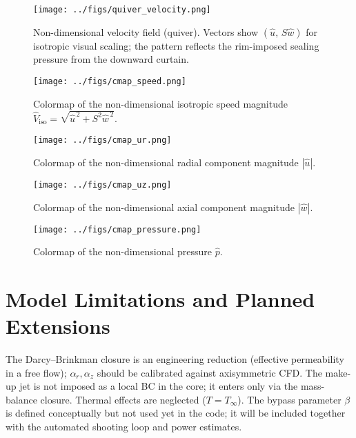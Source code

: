 \documentclass[11pt,a4paper]{article}
\begin{document}
\begin{figure}[H]
  \centering
  \texttt{[image: ../figs/quiver\_velocity.png]}
  \caption{Non-dimensional velocity field (quiver).
Vectors show $(\hat u,\,S\hat w)$ for isotropic visual scaling; the pattern reflects the rim-imposed sealing pressure from the downward curtain.}
  \label{fig:quiver}
\end{figure}\begin{figure}[H]
  \centering
  \texttt{[image: ../figs/cmap\_speed.png]}
  \caption{Colormap of the non-dimensional isotropic speed magnitude $\hat V_{\mathrm{iso}}=\sqrt{\hat u^{\,2}+S^{2}\hat w^{\,2}}$.}
  \label{fig:cmap_speed}
\end{figure}\begin{figure}[H]
  \centering
  \texttt{[image: ../figs/cmap\_ur.png]}
  \caption{Colormap of the non-dimensional radial component magnitude $|\hat u|$.}
  \label{fig:cmap_ur}
\end{figure}\begin{figure}[H]
  \centering
  \texttt{[image: ../figs/cmap\_uz.png]}
  \caption{Colormap of the non-dimensional axial component magnitude $|\hat w|$.}
  \label{fig:cmap_uz}
\end{figure}\begin{figure}[H]
  \centering
  \texttt{[image: ../figs/cmap\_pressure.png]}
  \caption{Colormap of the non-dimensional pressure $\hat p$.}
  \label{fig:cmap_p}
\end{figure}

\section{Model Limitations and Planned Extensions}
\label{sec:model-limitations-and-planned-extensions}

The Darcy--Brinkman closure is an engineering reduction (effective permeability in a
free flow); $\alpha_r,\alpha_z$ should be calibrated against axisymmetric CFD.
The make-up jet is not imposed as a local BC in the core; it enters only via the
mass-balance closure. Thermal effects are neglected ($T=T_\infty$). The bypass parameter
$\beta$ is defined conceptually but not used yet in the code; it will be included together
with the automated shooting loop and power estimates.
\end{document}
